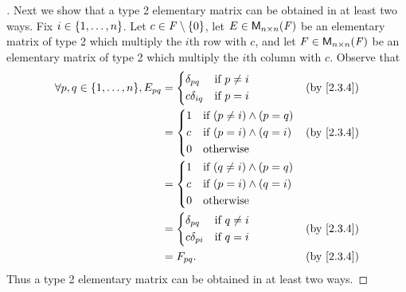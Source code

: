 \begin{proof}[]
  Next we show that a type 2 elementary matrix can be obtained in at least two ways.
  Fix \(i \in \left\lbrace1, \dots, n\right\rbrace\).
  Let \(c \in \mathit{F} \setminus \left\lbrace0\right\rbrace\), let \(E \in \mathsf{M}_{{n} \times n}({\mathit{F}})\) be an elementary matrix of type 2 which multiply the \(i\)th row with \(c\), and let \(F \in \mathsf{M}_{{n} \times n}({\mathit{F}})\) be an elementary matrix of type 2 which multiply the \(i\)th column with \(c\).
  Observe that
  \begin{align*}
    \forall p, q \in \set{1, \dots, n}, E_{p q} & = \begin{dcases}
                                                      \delta_{p q}   & \text{if } p \neq i \\
                                                      c \delta_{i q} & \text{if } p = i
                                                    \end{dcases}    &  & \text{(by \cref{2.3.4})}                          \\
                                                & = \begin{dcases}
                                                      1 & \text{if } (p \neq i) \land (p = q) \\
                                                      c & \text{if } (p = i) \land (q = i)    \\
                                                      0 & \text{otherwise}
                                                    \end{dcases} &  & \text{(by \cref{2.3.4})}                             \\
                                                & = \begin{dcases}
                                                      1 & \text{if } (q \neq i) \land (p = q) \\
                                                      c & \text{if } (p = i) \land (q = i)    \\
                                                      0 & \text{otherwise}
                                                    \end{dcases}                                \\
                                                & = \begin{dcases}
                                                      \delta_{p q}   & \text{if } q \neq i \\
                                                      c \delta_{p i} & \text{if } q = i
                                                    \end{dcases}    &  & \text{(by \cref{2.3.4})}                          \\
                                                & = F_{p q}.                                 &  & \text{(by \cref{2.3.4})}
  \end{align*}
  Thus a type 2 elementary matrix can be obtained in at least two ways.


\end{proof}
